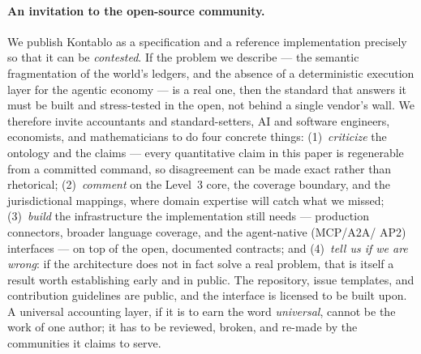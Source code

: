 \paragraph{An invitation to the open-source community.} We publish Kontablo as a
specification and a reference implementation precisely so that it can be
\emph{contested}. If the problem we describe --- the semantic fragmentation of
the world's ledgers, and the absence of a deterministic execution layer for the
agentic economy --- is a real one, then the standard that answers it must be
built and stress-tested in the open, not behind a single vendor's wall. We
therefore invite accountants and standard-setters, AI and software engineers,
economists, and mathematicians to do four concrete things: (1)~\emph{criticize}
the ontology and the claims --- every quantitative claim in this paper is
regenerable from a committed command, so disagreement can be made exact rather
than rhetorical; (2)~\emph{comment} on the Level~3 core, the coverage boundary,
and the jurisdictional mappings, where domain expertise will catch what we
missed; (3)~\emph{build} the infrastructure the implementation still needs ---
production connectors, broader language coverage, and the agent-native (MCP/A2A/
AP2) interfaces --- on top of the open, documented contracts; and (4)~\emph{tell
us if we are wrong}: if the architecture does not in fact solve a real problem,
that is itself a result worth establishing early and in public. The repository,
issue templates, and contribution guidelines are public, and the interface is
licensed to be built upon. A universal accounting layer, if it is to earn the
word \emph{universal}, cannot be the work of one author; it has to be reviewed,
broken, and re-made by the communities it claims to serve.
